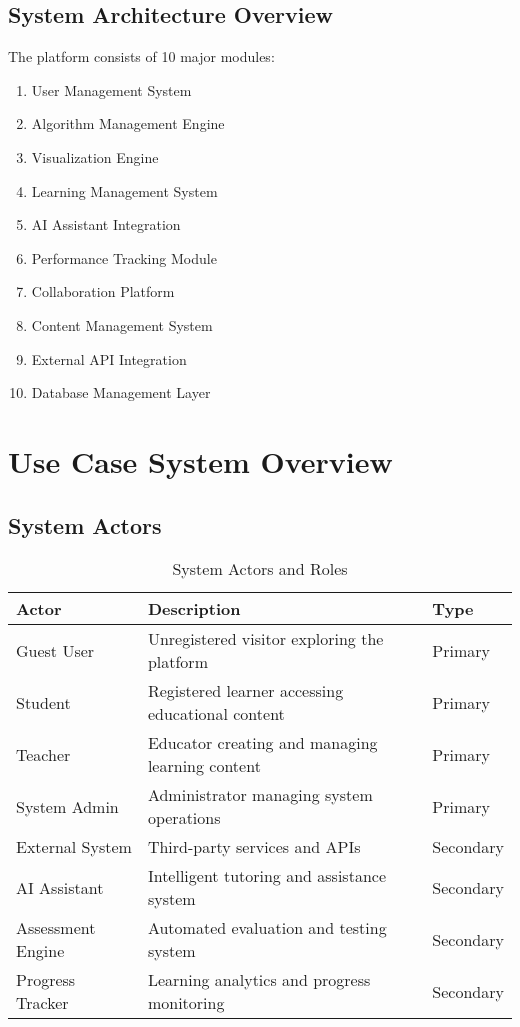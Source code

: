 \documentclass[12pt,a4paper]{article}
\begin{document}
\subsection{System Architecture Overview}
The platform consists of 10 major modules:
\begin{enumerate}
    \item User Management System
    \item Algorithm Management Engine
    \item Visualization Engine
    \item Learning Management System
    \item AI Assistant Integration
    \item Performance Tracking Module
    \item Collaboration Platform
    \item Content Management System
    \item External API Integration
    \item Database Management Layer
\end{enumerate}

\section{Use Case System Overview}

\subsection{System Actors}
\begin{table}[H]
\centering
\caption{System Actors and Roles}
\begin{tabularx}{\textwidth}{|l|X|l|}
\hline
\rowcolor{lightblue}
\textbf{Actor} & \textbf{Description} & \textbf{Type} \\
\hline
Guest User & Unregistered visitor exploring the platform & Primary \\
\hline
Student & Registered learner accessing educational content & Primary \\
\hline
Teacher & Educator creating and managing learning content & Primary \\
\hline
System Admin & Administrator managing system operations & Primary \\
\hline
External System & Third-party services and APIs & Secondary \\
\hline
AI Assistant & Intelligent tutoring and assistance system & Secondary \\
\hline
Assessment Engine & Automated evaluation and testing system & Secondary \\
\hline
Progress Tracker & Learning analytics and progress monitoring & Secondary \\
\hline
\end{tabularx}
\end{table}
\end{document}
